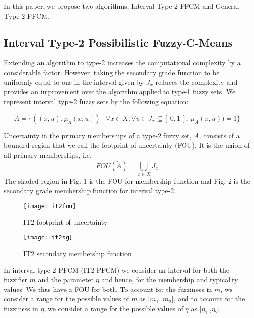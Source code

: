 \documentclass[journal, onecolumn]{IEEEtran}
\begin{document}
In this paper, we propose two algorithms, Interval Type-2 PFCM and General Type-2 PFCM.


\subsection{Interval Type-2 Possibilistic Fuzzy-C-Means}

Extending an algorithm to type-2 increases the computational complexity by a considerable factor. However, taking the secondary grade function to be uniformly equal to one in the interval given by $J_x$ reduces the complexity and provides an improvement over the algorithm applied to type-1 fuzzy sets. 
We represent interval type-2 fuzzy sets by the following equation: 


\begin{equation}
\tilde{A}= {\{ ((x,u),\mu_{\tilde{A}}(x,u))\: | \: \forall x \in X, \forall u \in J_x \subseteq [\: 0,1 \:], \: \mu_{\tilde{A}}(x,u))=1 \}}
\end{equation}

Uncertainty in the primary memberships of a type-2 fuzzy set, $\tilde{A}$, consists of a bounded region that we call the footprint of uncertainty (FOU). It is the union of all primary memberships, i.e.
\begin{equation}
FOU(\tilde{A})= \bigcup_{x \in X} J_x
\end{equation}
The shaded region in Fig.  1  is the FOU for membership function and Fig.  2 is the secondary grade membership function for interval type-2.

\begin{figure}[htb]
\begin{minipage}{0.5\textwidth}
  \centering
  \texttt{[image: it2fou]}
  \caption{IT2 footprint of uncertainty}
\end{minipage}%
\begin{minipage}{0.5\textwidth}
  \centering
  \texttt{[image: it2sg]}
  \caption{IT2 secondary membership function}
\end{minipage}%
\end{figure}

In interval type-2 PFCM (IT2-PFCM) we consider an interval for both the fuzzifier $m$ and the parameter $\eta$ and hence, for the membership and typicality values. We thus have a FOU for both. To account for the fuzziness in $m$, we consider a range for the possible values of $m$ as [$m_1$, $m_2$], and to account for the fuzziness in $\eta$, we consider a range for the possible values of $\eta$ as [$\eta_1$ ,$\eta_2$].
\end{document}
